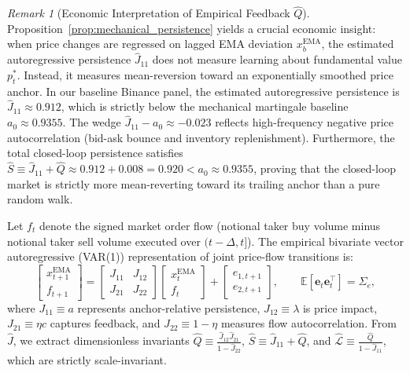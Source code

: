 \documentclass[12pt]{article}
\theoremstyle{definition}
\theoremstyle{remark}
\newtheorem{remark}[theorem]{Remark}
\newcommand{\E}{\mathbb{E}}
\begin{document}
\begin{remark}[Economic Interpretation of Empirical Feedback $\hat{Q}$]
Proposition~\ref{prop:mechanical_persistence} yields a crucial economic insight: when price changes are regressed on lagged EMA deviation $x_b^{\text{EMA}}$, the estimated autoregressive persistence $\hat{J}_{11}$ does not measure learning about fundamental value $p_t^*$. Instead, it measures mean-reversion toward an exponentially smoothed price anchor. In our baseline Binance panel, the estimated autoregressive persistence is $\hat{J}_{11} \approx 0.912$, which is strictly below the mechanical martingale baseline $a_0 \approx 0.9355$. The wedge $\hat{J}_{11} - a_0 \approx -0.023$ reflects high-frequency negative price autocorrelation (bid-ask bounce and inventory replenishment). Furthermore, the total closed-loop persistence satisfies $\hat{S} \equiv \hat{J}_{11} + \hat{Q} \approx 0.912 + 0.008 = 0.920 < a_0 \approx 0.9355$, proving that the closed-loop market is strictly more mean-reverting toward its trailing anchor than a pure random walk.
\end{remark}

Let $f_t$ denote the signed market order flow (notional taker buy volume minus notional taker sell volume executed over $(t-\Delta, t]$). The empirical bivariate vector autoregressive (VAR(1)) representation of joint price-flow transitions is:
\begin{equation}
\begin{bmatrix} x_{t+1}^{\text{EMA}} \\ f_{t+1} \end{bmatrix} = \begin{bmatrix} J_{11} & J_{12} \\ J_{21} & J_{22} \end{bmatrix} \begin{bmatrix} x_t^{\text{EMA}} \\ f_t \end{bmatrix} + \begin{bmatrix} e_{1, t+1} \\ e_{2, t+1} \end{bmatrix}, \qquad \E[\mathbf{e}_t \mathbf{e}_t^\top] = \Sigma_e,
\label{eq:bivariate_var}
\end{equation}
where $J_{11} \equiv a$ represents anchor-relative persistence, $J_{12} \equiv \lambda$ is price impact, $J_{21} \equiv \eta c$ captures feedback, and $J_{22} \equiv 1 - \eta$ measures flow autocorrelation. From $\hat{J}$, we extract dimensionless invariants $\hat{Q} \equiv \frac{\hat{J}_{12} \hat{J}_{21}}{1 - \hat{J}_{22}}$, $\hat{S} \equiv \hat{J}_{11} + \hat{Q}$, and $\hat{\mathcal{L}} \equiv \frac{\hat{Q}}{1 - \hat{J}_{11}}$, which are strictly scale-invariant.
\end{document}
